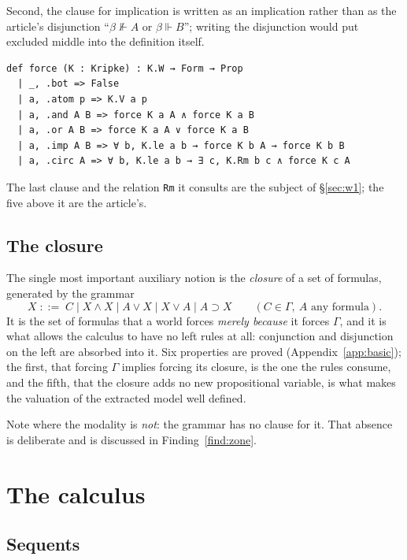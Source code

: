 \documentclass[11pt,a4paper]{article}
\begin{document}
Second, the clause for implication is written as an implication rather
than as the article's disjunction ``$\beta \nVdash A$ or $\beta \Vdash
B$''; writing the disjunction would put excluded middle into the
definition itself.

\begin{lstlisting}
def force (K : Kripke) : K.W → Form → Prop
  | _, .bot => False
  | a, .atom p => K.V a p
  | a, .and A B => force K a A ∧ force K a B
  | a, .or A B => force K a A ∨ force K a B
  | a, .imp A B => ∀ b, K.le a b → force K b A → force K b B
  | a, .circ A => ∀ b, K.le a b → ∃ c, K.Rm b c ∧ force K c A
\end{lstlisting}

\noindent
The last clause and the relation \texttt{Rm} it consults are the subject
of \S\ref{sec:w1}; the five above it are the article's.

\subsection{The closure}

The single most important auxiliary notion is the \emph{closure} of a set
of formulas, generated by the grammar
\[
X \;::=\; C \mid X \land X \mid A \lor X \mid X \lor A \mid A \supset X
\qquad (C \in \Gamma,\ A \text{ any formula}).
\]
It is the set of formulas that a world forces \emph{merely because} it
forces $\Gamma$, and it is what allows the calculus to have no left rules
at all: conjunction and disjunction on the left are absorbed into it. Six
properties are proved (Appendix~\ref{app:basic}); the first, that forcing
$\Gamma$ implies forcing its closure, is the one the rules consume, and
the fifth, that the closure adds no new propositional variable, is what
makes the valuation of the extracted model well defined.

Note where the modality is \emph{not}: the grammar has no clause for it.
That absence is deliberate and is discussed in
Finding~\ref{find:zone}.

\section{The calculus}
\label{sec:calc}

\subsection{Sequents}
\end{document}
